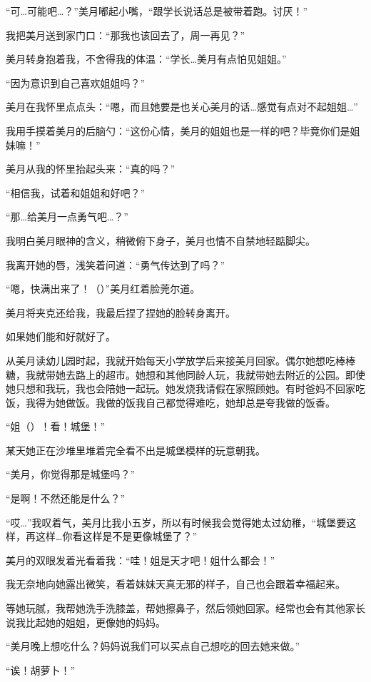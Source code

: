 “可…可能吧…？”美月嘟起小嘴，“跟学长说话总是被带着跑。讨厌！”

我把美月送到家门口：“那我也该回去了，周一再见？”

美月转身抱着我，不舍得我的体温：“学长…美月有点怕见姐姐。”

“因为意识到自己喜欢姐姐吗？”

美月在我怀里点点头：“嗯，而且她要是也关心美月的话…感觉有点对不起姐姐…”

我用手摸着美月的后脑勺：“这份心情，美月的姐姐也是一样的吧？毕竟你们是姐妹嘛！”

美月从我的怀里抬起头来：“真的吗？”

“相信我，试着和姐姐和好吧？”

“那…给美月一点勇气吧…？”

我明白美月眼神的含义，稍微俯下身子，美月也情不自禁地轻踮脚尖。

我离开她的唇，浅笑着问道：“勇气传达到了吗？”

“嗯，快满出来了！（）”美月红着脸莞尔道。

美月将夹克还给我，我最后捏了捏她的脸转身离开。

如果她们能和好就好了。

\cutlinesm

\newday{\sunny}

从美月读幼儿园时起，我就开始每天小学放学后来接美月回家。偶尔她想吃棒棒糖，我就带她去路上的超市。她想和其他同龄人玩，我就带她去附近的公园。即使她只想和我玩，我也会陪她一起玩。她发烧我请假在家照顾她。有时爸妈不回家吃饭，我得为她做饭。我做的饭我自己都觉得难吃，她却总是夸我做的饭香。

“姐（）！看！城堡！”

某天她正在沙堆里堆着完全看不出是城堡模样的玩意朝我。

“美月，你觉得那是城堡吗？”

“是啊！不然还能是什么？”

“哎…”我叹着气，美月比我小五岁，所以有时候我会觉得她太过幼稚，“城堡要这样，再这样…你看这样是不是更像城堡了？”

美月的双眼发着光看着我：“哇！姐是天才吧！姐什么都会！”

我无奈地向她露出微笑，看着妹妹天真无邪的样子，自己也会跟着幸福起来。

等她玩腻，我帮她洗手洗膝盖，帮她擦鼻子，然后领她回家。经常也会有其他家长说我比起她的姐姐，更像她的妈妈。

“美月晚上想吃什么？妈妈说我们可以买点自己想吃的回去她来做。”

“诶！胡萝卜！”

